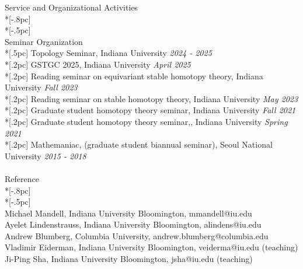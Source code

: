 \documentclass{article}
\begin{document}
{\Large  Service and Organizational Activities} \\*[-.8pc]
\underline{\hspace{6.5in}} \\*[-.5pc]
\\
{ \large Seminar Organization} \\*[.5pc]
{ Topology Seminar}, Indiana University \hfill {\it 2024 - 2025\/} \\*[.2pc]
{ GSTGC 2025}, Indiana University \hfill {\it April 2025\/} \\*[.2pc]
{ Reading seminar on equivariant stable homotopy theory}, Indiana University \hfill {\it Fall 2023 \/} \\*[.2pc]
{ Reading seminar on stable homotopy theory}, Indiana University \hfill {\it May 2023 \/} \\*[.2pc]
{ Graduate student homotopy theory seminar}, Indiana University \hfill {\it Fall 2021\/} \\*[.2pc]
{ Graduate student homotopy theory seminar,}, Indiana University \hfill {\it Spring 2021\/} \\*[.2pc]
{ Mathemaniac}, (graduate student biannual seminar), Seoul National University  \hfill {\it 2015 - 2018\/} \\
\\
{\Large  Reference} \\*[-.8pc]
\underline{\hspace{6.5in}} \\*[-.5pc]
\\
{Michael Mandell, Indiana University Bloomington, mmandell@iu.edu}  \\
{Ayelet Lindenstrauss, Indiana University Bloomington, alindens@iu.edu} \\
{Andrew Blumberg, Columbia University, andrew.blumberg@columbia.edu}  \\
{Vladimir Eiderman, Indiana University Bloomington, veiderma@iu.edu} \hfill {(teaching)} \\
{Ji-Ping Sha, Indiana University Bloomington, jsha@iu.edu} \hfill {(teaching)} \\
\end{document}
